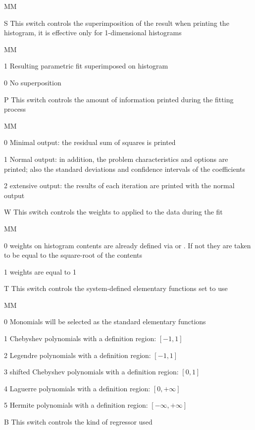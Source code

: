 \begin{DLtt}{MM}
\item[S] This switch controls the superimposition of the
result when
printing the histogram, it is effective only
for 1-dimensional histograms
\begin{DLtt}{MM}
\item[1] Resulting parametric fit superimposed on histogram
\item[0] No superposition
\end{DLtt}
\item[P] This switch controls the amount of information
printed during the
fitting process
\begin{DLtt}{MM}
\item[0] Minimal output: the residual sum of squares is
printed
\item[1] Normal output: in addition, the problem characteristics
and
options are printed; also the standard deviations and confidence intervals
of the coefficients
\item[2] extensive output: the results of each iteration
are printed with the
normal output
\end{DLtt}
\item[W] This switch controls the weights to applied to
the data during the fit
\begin{DLtt}{MM}
\item[0] weights on histogram contents are already defined via
 or . If not they are taken to be equal to the
square-root of the contents
\item[1] weights are equal to 1
\end{DLtt}
\item[T] This switch controls the system-defined elementary
functions set to use
\begin{DLtt}{MM}
\item[0] Monomials will be selected as the standard elementary
functions
\item[1] Chebyshev polynomials with a definition region: $[-1,1]$
\item[2] Legendre polynomials with a definition region: $[-1,1]$
\item[3] shifted Chebyshev polynomials with a definition region: $[0,1]$
\item[4] Laguerre polynomials with a definition region: $[0,+\infty]$
\item[5] Hermite polynomials with a definition region:  $[-\infty,+\infty]$
\end{DLtt}
\item[B] This switch controls the kind of regressor used

\end{DLtt}
